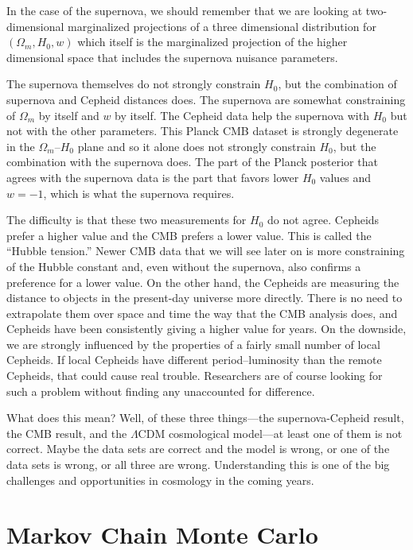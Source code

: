 In the case of the supernova, we should remember that we are looking at two-dimensional marginalized projections of a three dimensional distribution for $(\Omega_m, H_0, w)$ which itself is the marginalized projection of the higher dimensional space that includes the supernova nuisance parameters.

The supernova themselves do not strongly constrain $H_0$, but the combination of supernova and Cepheid distances does.  The supernova are somewhat constraining of $\Omega_m$ by itself and $w$ by itself.  The Cepheid data help the supernova with $H_0$ but not with the other parameters.  This Planck CMB dataset is strongly degenerate in the $\Omega_m$--$H_0$ plane and so it alone does not strongly constrain $H_0$, but the combination with the supernova does. The part of the Planck posterior that agrees with the supernova data is the part that favors lower $H_0$ values and $w=-1$, which is what the supernova requires.

The difficulty is that these two measurements for $H_0$ do not agree.  Cepheids prefer a higher value and the CMB prefers a lower value.  This is called the ``Hubble tension.''  Newer CMB data that we will see later on is more constraining of the Hubble constant and, even without the supernova, also confirms a preference for a lower value.  On the other hand, the Cepheids are measuring the distance to objects in the present-day universe more directly.  There is no need to extrapolate them over space and time the way that the CMB analysis does, and Cepheids have been consistently giving a higher value for years.  On the downside, we are strongly influenced by the properties of a fairly small number of local Cepheids.  If local Cepheids have different period--luminosity than the remote Cepheids, that could cause real trouble.  Researchers are of course looking for such a problem without finding any unaccounted for difference.

What does this mean?  Well, of these three things---the supernova-Cepheid result, the CMB result, and the $\Lambda$CDM cosmological model---at least one of them is not correct.  Maybe the data sets are correct and the model is wrong, or one of the data sets is wrong, or all three are wrong.  Understanding this is one of the big challenges and opportunities in cosmology in the coming years.


\section{Markov Chain Monte Carlo}

